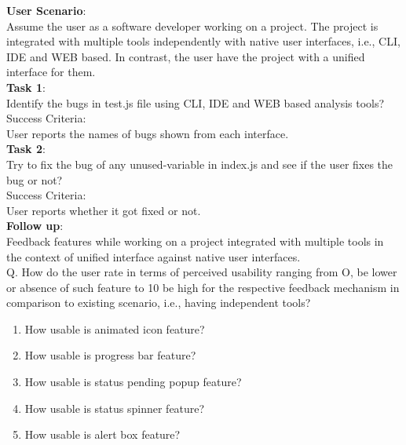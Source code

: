 \textbf{User Scenario}: \\

Assume the user as a software developer working on a project. The project is integrated with multiple tools independently with native user interfaces, i.e., CLI, IDE and WEB based. In contrast, the user have the project with a unified interface for them. \\


\textbf{Task 1}: \\

Identify the bugs in test.js file using CLI, IDE and WEB based analysis tools? \\

Success Criteria: \\

User reports the names of bugs shown from each interface. \\


\textbf{Task 2}: \\

Try to fix the bug of any unused-variable in index.js and see if the user fixes the bug or not? \\


Success Criteria: \\

User reports whether it got fixed or not. \\

\textbf{Follow up}: \\

Feedback features while working on a project integrated with multiple tools in the context of unified interface against native user interfaces. \\

Q. How do the user rate in terms of perceived usability ranging from O, be lower or absence of such feature to 10 be high for the respective feedback mechanism in comparison to existing scenario, i.e., having independent tools? \\
\begin{enumerate}
\item  How usable is animated icon feature? 
\item  How usable is progress bar feature? 
\item  How usable is status pending popup feature? 
\item  How usable is status spinner feature? 
\item  How usable is alert box feature? \\
\end{enumerate}

